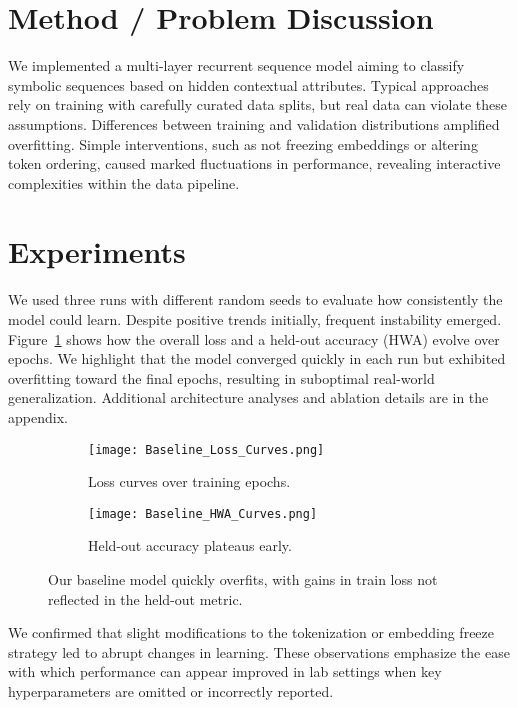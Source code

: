 \documentclass[11pt,onecolumn]{article}
\begin{document}
\section{Method / Problem Discussion}
We implemented a multi-layer recurrent sequence model aiming to classify symbolic sequences based on hidden contextual attributes. Typical approaches rely on training with carefully curated data splits, but real data can violate these assumptions. Differences between training and validation distributions amplified overfitting. Simple interventions, such as not freezing embeddings or altering token ordering, caused marked fluctuations in performance, revealing interactive complexities within the data pipeline.

\section{Experiments}
We used three runs with different random seeds to evaluate how consistently the model could learn. Despite positive trends initially, frequent instability emerged. Figure~\ref{fig:baseline_curves} shows how the overall loss and a held-out accuracy (HWA) evolve over epochs. We highlight that the model converged quickly in each run but exhibited overfitting toward the final epochs, resulting in suboptimal real-world generalization. Additional architecture analyses and ablation details are in the appendix.

\begin{figure}[t]
\centering
\begin{subfigure}[b]{0.45\textwidth}
  \centering
  \texttt{[image: Baseline\_Loss\_Curves.png]}
  \caption{Loss curves over training epochs.}
\end{subfigure}
\hfill
\begin{subfigure}[b]{0.45\textwidth}
  \centering
  \texttt{[image: Baseline\_HWA\_Curves.png]}
  \caption{Held-out accuracy plateaus early.}
\end{subfigure}
\caption{Our baseline model quickly overfits, with gains in train loss not reflected in the held-out metric.\label{fig:baseline_curves}}
\vspace{-1em}
\end{figure}

We confirmed that slight modifications to the tokenization or embedding freeze strategy led to abrupt changes in learning. These observations emphasize the ease with which performance can appear improved in lab settings when key hyperparameters are omitted or incorrectly reported.
\end{document}
